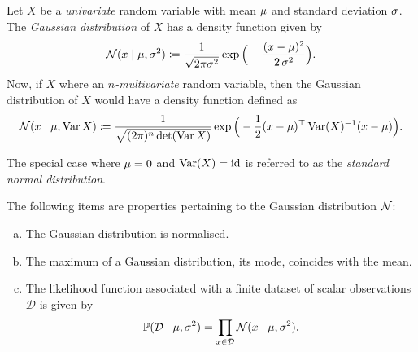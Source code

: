 \begin{definition}
\label{def:gaussian-distribution}
Let \(X\) be a \emph{univariate} random variable with mean \(\mu\) and
standard deviation \(\operatorname{\sigma}\). The \emph{Gaussian distribution} of \(X\) has a
density function given by
\[
\operatorname{\mathcal{N}}(x \mid \mu, \operatorname{\sigma}^2) \coloneq \frac{1}{\sqrt{2 \pi \sigma^{2}}}
\exp\Big( -\frac{(x - \mu)^2}{2 \operatorname{\sigma}^2} \Big).
\]
Now, if \(X\) where an \emph{\(n\)-multivariate} random variable, then the Gaussian
distribution of \(X\) would have a density function defined as
\[
\operatorname{\mathcal{N}}(x \mid \mu, \operatorname{Var} X) \coloneq \frac{1}{\sqrt{(2 \pi)^n \det(\operatorname{Var} X)}}
\exp\Big(-\frac{1}{2} (x - \mu)^{\operatorname{\top}} \operatorname{Var}(X)^{-1} (x - \mu)\Big).
\]

The special case where \(\mu = 0\) and \(\operatorname{Var}(X) = \operatorname{id}\) is referred to as the
\emph{standard normal distribution}.
\end{definition}

\begin{proposition}
\label{prop:gaussian-distribution-basic-properties}
The following items are properties pertaining to the Gaussian distribution
\(\operatorname{\mathcal{N}}\):
\begin{enumerate}[(a)]\setlength\itemsep{0em}
\item The Gaussian distribution is normalised.

\item The maximum of a Gaussian distribution, its mode, coincides with the mean.

\item The likelihood function associated with a finite dataset of scalar
  observations \(\mathcal{D}\) is given by
  \[
  \operatorname{\mathbb{P}}(\mathcal{D} \mid \mu, \operatorname{\sigma}^2)
  = \prod_{x \in \mathcal{D}} \operatorname{\mathcal{N}}(x \mid \mu, \operatorname{\sigma}^2).
  \]
\end{enumerate}
\end{proposition}

